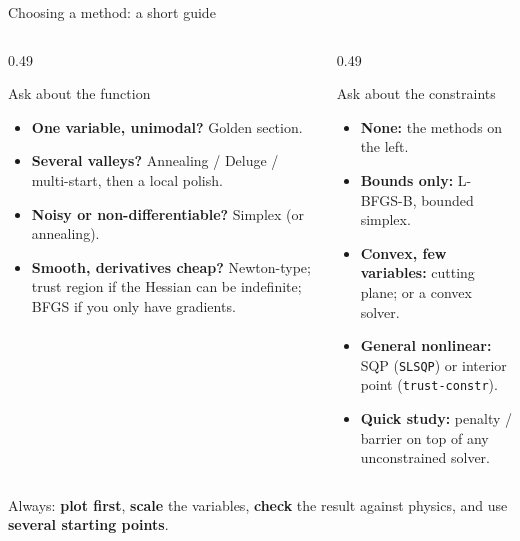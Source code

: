 \begin{frame}{Choosing a method: a short guide}
  \begin{columns}[T]
    \begin{column}{0.49\textwidth}
      \begin{block}{Ask about the function}
        \small
        \begin{itemize}
          \item \textbf{One variable, unimodal?} Golden section.
          \item \textbf{Several valleys?} Annealing / Deluge / multi-start, then a local polish.
          \item \textbf{Noisy or non-differentiable?} Simplex (or annealing).
          \item \textbf{Smooth, derivatives cheap?} Newton-type; trust region if the Hessian can be indefinite; BFGS if you only have gradients.
        \end{itemize}
      \end{block}
    \end{column}
    \begin{column}{0.49\textwidth}
      \begin{block}{Ask about the constraints}
        \small
        \begin{itemize}
          \item \textbf{None:} the methods on the left.
          \item \textbf{Bounds only:} L-BFGS-B, bounded simplex.
          \item \textbf{Convex, few variables:} cutting plane; or a convex solver.
          \item \textbf{General nonlinear:} SQP (\texttt{SLSQP}) or interior point (\texttt{trust-constr}).
          \item \textbf{Quick study:} penalty / barrier on top of any unconstrained solver.
        \end{itemize}
      \end{block}
    \end{column}
  \end{columns}
  \vspace{0.1cm}
  \centering\small Always: \textbf{plot first}, \textbf{scale} the variables, \textbf{check} the result against physics, and use \textbf{several starting points}.
\end{frame}

